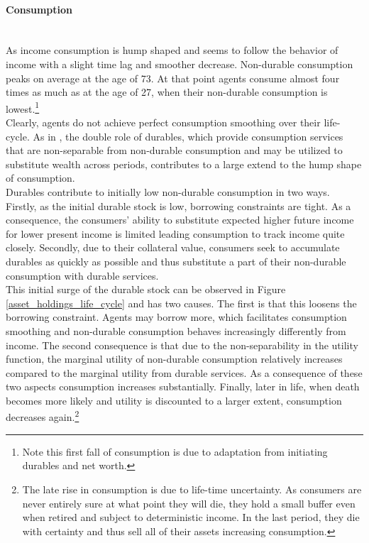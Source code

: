\documentclass[a4paper,12pt,legno]{article}
\newcommand{\myparagraph}[1]{\paragraph{#1}\mbox{}\\}
\begin{document}
\myparagraph{Consumption} As income consumption is hump shaped and seems to follow the behavior of income with a slight time lag and smoother decrease. Non-durable consumption peaks on average at the age of 73. At that point agents consume almost four times as much as at the age of 27, when their non-durable consumption is lowest.\footnote{Note this first fall of consumption is due to adaptation from initiating durables and net worth.} \\
Clearly, agents do not achieve perfect consumption smoothing over their life-cycle. As in \cite{FV&K2011}, the double role of durables, which provide consumption services that are non-separable from non-durable consumption and may be utilized to substitute wealth across periods, contributes to a large extend to the hump shape of consumption.\\
Durables contribute to initially low non-durable consumption in two ways. Firstly, as the initial durable stock is low, borrowing constraints are tight. As a consequence, the consumers' ability to substitute expected higher future income for lower present income is limited leading consumption to track income quite closely. Secondly, 
due to their collateral value, consumers seek to accumulate durables as quickly as possible and thus substitute a part of their non-durable consumption with durable services. \\
This initial surge of the durable stock can be observed in Figure \ref{asset_holdings_life_cycle} and has two causes. The first is that this loosens the borrowing constraint. Agents may borrow more, which facilitates consumption smoothing and non-durable consumption behaves increasingly differently from income. The second consequence is that due to the non-separability in the utility function, the marginal utility of non-durable consumption relatively increases compared to the marginal utility from durable services. As a consequence of these two aspects consumption increases substantially. 
Finally, later in life, when death becomes more likely and utility is discounted to a larger extent, consumption decreases again.\footnote{The late rise in consumption is due to life-time uncertainty. As consumers are never entirely sure at what point they will die, they hold a small buffer even when retired and subject to deterministic income. In the last period, they die with certainty and thus sell all of their assets increasing consumption.} 
\end{document}
